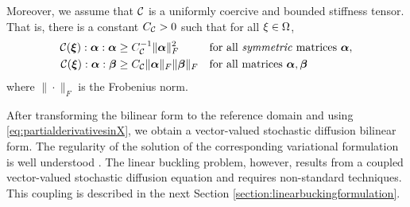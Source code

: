 Moreover, we assume that $\mathcal{C}$ is a uniformly coercive and bounded stiffness tensor.
  That is, there is a constant $C_{\mathcal{C}} > 0$ such that for all $\mathbf{\xi}\in\Omega$,
  \begin{align}
  \mathcal{C}({\boldsymbol{\xi}}): \boldsymbol{\alpha} : \boldsymbol{\alpha}& \geq C_{\mathcal{C}}^{-1} \| \boldsymbol{\alpha} \|_F^2  &&\text{for all \emph{symmetric} matrices } \boldsymbol{\alpha} , \label{eq:stiffnesstensorcoercivity}\\
  \mathcal{C}({\boldsymbol{\xi}}): \boldsymbol{\alpha} : \boldsymbol{\beta}& \geq C_{\mathcal{C}} \| \boldsymbol{\alpha} \|_F  \| \boldsymbol{\beta} \|_F&&\text{for all matrices } \boldsymbol{\alpha},   \boldsymbol{\beta}\label{eq:stiffnesstensorupperbound}\\
  \end{align}
  where $\|\cdot\|_F$ is the Frobenius norm.
  
%
After transforming the bilinear form to the reference domain and using \eqref{eq:partialderivativesinX}, we obtain a vector-valued stochastic diffusion bilinear form. The regularity of the solution of the corresponding variational formulation is well understood \cite{Reference}. The linear buckling problem, however, results from a coupled vector-valued stochastic diffusion equation and requires non-standard techniques. This coupling is described in the next Section \ref{section:linearbuckingformulation}. %

